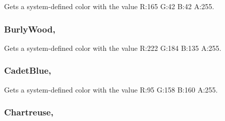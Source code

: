 Gets a system-\/defined color with the value R\+:165 G\+:42 B\+:42 A\+:255.

\hypertarget{structMicrosoft_1_1Xna_1_1Framework_1_1Color_a74f360bf9e9fc4e425ba3e357d2391e8}{}
\subsubsection[{Burly\+Wood}]{ Burly\+Wood\hspace{0.3cm}{\ttfamily [static]}, {\ttfamily [get]}}\label{structMicrosoft_1_1Xna_1_1Framework_1_1Color_a74f360bf9e9fc4e425ba3e357d2391e8}


Gets a system-\/defined color with the value R\+:222 G\+:184 B\+:135 A\+:255.

\hypertarget{structMicrosoft_1_1Xna_1_1Framework_1_1Color_a2db4a95aaa374a93dc04dcd80abbb829}{}
\subsubsection[{Cadet\+Blue}]{ Cadet\+Blue\hspace{0.3cm}{\ttfamily [static]}, {\ttfamily [get]}}\label{structMicrosoft_1_1Xna_1_1Framework_1_1Color_a2db4a95aaa374a93dc04dcd80abbb829}


Gets a system-\/defined color with the value R\+:95 G\+:158 B\+:160 A\+:255.

\hypertarget{structMicrosoft_1_1Xna_1_1Framework_1_1Color_a3a38f15c273b34ece6cd53740a69adaa}{}
\subsubsection[{Chartreuse}]{ Chartreuse\hspace{0.3cm}{\ttfamily [static]}, {\ttfamily [get]}}\label{structMicrosoft_1_1Xna_1_1Framework_1_1Color_a3a38f15c273b34ece6cd53740a69adaa}


